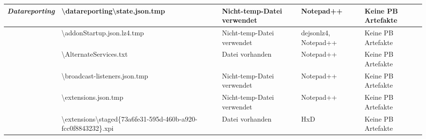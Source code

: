 \begin{appendices}
{\begin{landscape}
\begin{table}[h!]
{\begin{tabular}{cllll}
	\multicolumn{1}{|c|}{\multirow{-2}{*}{\textit{Datareporting}}}                                                & \multicolumn{1}{l|}{\cellcolor[HTML]{3190FF}\textbackslash{}datareporting\textbackslash{}state.json.tmp}                                       & \multicolumn{1}{l|}{\cellcolor[HTML]{FCFF2F}Nicht-temp-Datei verwendet} & \multicolumn{1}{l|}{\cellcolor[HTML]{FFFFFF}Notepad++}            & \multicolumn{1}{l|}{\cellcolor[HTML]{F8A102}Keine PB Artefakte} \\ \hline
	\multicolumn{1}{|c|}{}                                                                                        & \multicolumn{1}{l|}{\cellcolor[HTML]{3190FF}\textbackslash{}addonStartup.json.lz4.tmp}                                                         & \multicolumn{1}{l|}{\cellcolor[HTML]{FCFF2F}Nicht-temp-Datei verwendet} & \multicolumn{1}{l|}{\cellcolor[HTML]{FFFFFF}dejsonlz4, Notepad++} & \multicolumn{1}{l|}{\cellcolor[HTML]{F8A102}Keine PB Artefakte} \\ \cline{2-5} 
	\multicolumn{1}{|c|}{}                                                                                        & \multicolumn{1}{l|}{\cellcolor[HTML]{3190FF}\textbackslash{}AlternateServices.txt}                                                             & \multicolumn{1}{l|}{\cellcolor[HTML]{009901}Datei vorhanden}            & \multicolumn{1}{l|}{\cellcolor[HTML]{FFFFFF}Notepad++}            & \multicolumn{1}{l|}{\cellcolor[HTML]{F8A102}Keine PB Artefakte} \\ \cline{2-5} 
	\multicolumn{1}{|c|}{}                                                                                        & \multicolumn{1}{l|}{\cellcolor[HTML]{3190FF}\textbackslash{}broadcast-listeners.json.tmp}                                                      & \multicolumn{1}{l|}{\cellcolor[HTML]{FCFF2F}Nicht-temp-Datei verwendet} & \multicolumn{1}{l|}{\cellcolor[HTML]{FFFFFF}Notepad++}            & \multicolumn{1}{l|}{\cellcolor[HTML]{F8A102}Keine PB Artefakte} \\ \cline{2-5} 
	\multicolumn{1}{|c|}{}                                                                                        & \multicolumn{1}{l|}{\cellcolor[HTML]{3190FF}\textbackslash{}extensions.json.tmp}                                                               & \multicolumn{1}{l|}{\cellcolor[HTML]{FCFF2F}Nicht-temp-Datei verwendet} & \multicolumn{1}{l|}{\cellcolor[HTML]{FFFFFF}Notepad++}            & \multicolumn{1}{l|}{\cellcolor[HTML]{F8A102}Keine PB Artefakte} \\ \cline{2-5} 
	\multicolumn{1}{|c|}{}                                                                                        & \multicolumn{1}{l|}{\cellcolor[HTML]{3190FF}\textbackslash{}extensions\textbackslash{}staged\{73a6fe31-595d-460b-a920-fcc0f8843232\}.xpi}      & \multicolumn{1}{l|}{\cellcolor[HTML]{009901}Datei vorhanden}            & \multicolumn{1}{l|}{\cellcolor[HTML]{FFFFFF}HxD}                  & \multicolumn{1}{l|}{\cellcolor[HTML]{F8A102}Keine PB Artefakte} \\ \cline{2-5} 

\end{tabular}}
\end{table}
\end{landscape}}
\end{appendices}
